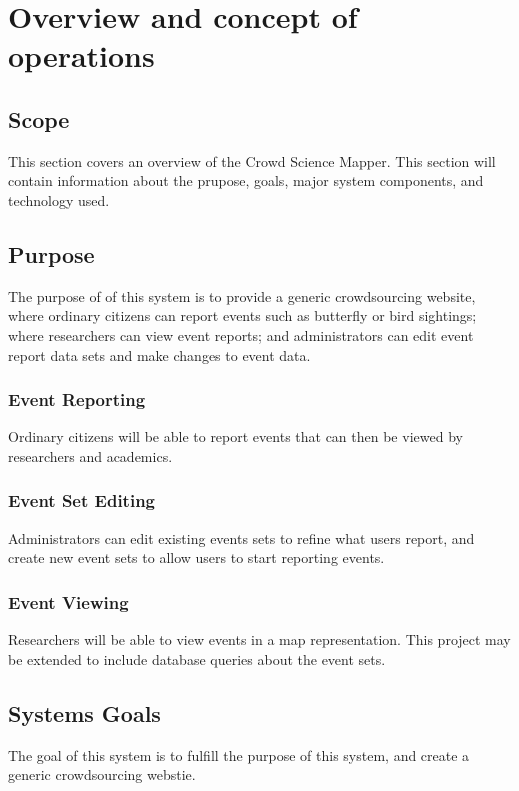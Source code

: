 
\chapter{Overview and concept of operations}

\section{Scope}
This section covers an overview of the Crowd Science Mapper. This section will contain information about the prupose, goals, major system components, and technology used.


\section{Purpose}
The purpose of of this system is to provide a generic crowdsourcing website, where ordinary citizens can report events such as butterfly or bird sightings; where researchers can view event reports; and administrators can edit event report data sets and make changes to event data.


\subsection{Event Reporting}
Ordinary citizens will be able to report events that can then be viewed by researchers and academics. 

\subsection{Event Set Editing}
Administrators can edit existing events sets to refine what users report, and create new event sets to allow users to start reporting events. 

\subsection{Event Viewing}
Researchers will be able to view events in a map representation. This project may be extended to include database queries about the event sets.

\section{Systems Goals}
The goal of this system is to fulfill the purpose of this system, and create a generic crowdsourcing webstie.

